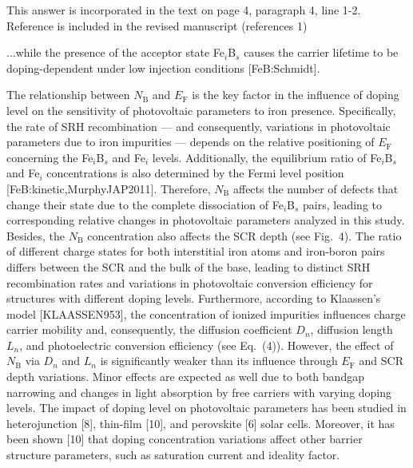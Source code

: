 \documentclass[a4paper,fleqn]{cas-sc}
\begin{document}
This answer is incorporated in the text on page 4, paragraph 4, line 1-2.
Reference  is included in the revised manuscript (references 1)







\begin{mdframed}
...while the presence of the acceptor state Fe$_i$B$_s$ causes the
carrier lifetime to be doping-dependent under low injection conditions [FeB:Schmidt].

\textcolor[rgb]{1.00,0.07,0.00}{
The relationship between $N_\mathrm{B}$ and $E_\mathrm{F}$ is the key  factor
in the influence of doping level on the sensitivity of photovoltaic parameters to iron presence.
Specifically, the rate of SRH recombination ---
and consequently, variations in photovoltaic parameters due to iron impurities ---
depends on the relative positioning of $E_\mathrm{F}$ concerning the Fe$_i$B$_s$ and Fe$_i$ levels.
Additionally, the equilibrium ratio of Fe$_i$B$_s$ and Fe$_i$ concentrations is also determined by the Fermi level position [FeB:kinetic,MurphyJAP2011].
Therefore, $N_\mathrm{B}$ affects the number of defects that change their state due to the complete dissociation of Fe$_i$B$_s$ pairs,
leading to corresponding relative changes in photovoltaic parameters analyzed in this study.
Besides, the $N_\mathrm{B}$ concentration also affects the SCR depth (see Fig.~4).
The ratio of different charge states for both interstitial iron atoms and iron-boron pairs differs between the SCR and the bulk of the base, leading to distinct SRH recombination rates and variations in photovoltaic conversion efficiency for structures with different doping levels.
Furthermore, according to Klaassen’s model [KLAASSEN953],
the concentration of ionized impurities influences charge carrier mobility and, consequently, the diffusion coefficient $D_n$, diffusion length $L_n$,
and photoelectric conversion efficiency (see Eq.~(4)).
However, the effect of $N_\mathrm{B}$ via $D_n$ and $L_n$ is significantly weaker than its influence through $E_\mathrm{F}$ and SCR depth variations.
Minor effects are expected as well due to both bandgap narrowing and changes in light absorption by free carriers with varying doping levels.
The impact of doping level on photovoltaic parameters has been studied in heterojunction [8],
thin-film [10],
and perovskite [6] solar cells.
Moreover, it has been shown [10] that
doping concentration variations affect other barrier structure parameters, such as saturation current and ideality factor.
}
\end{mdframed}
\end{document}
